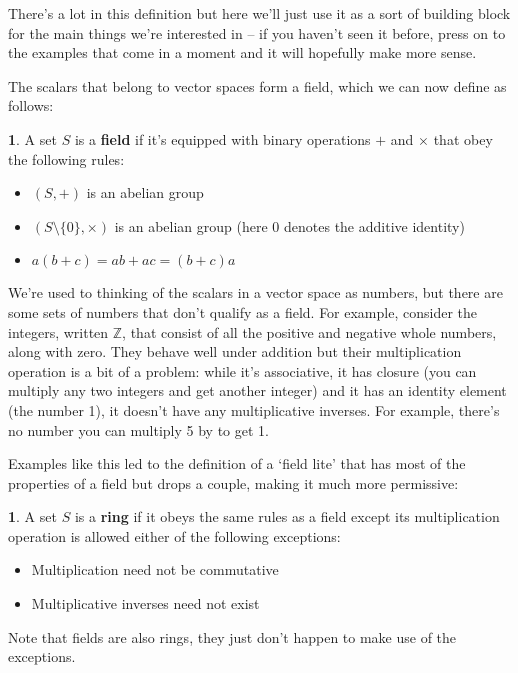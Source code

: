 \documentclass[oneside,english]{amsbook}
\numberwithin{section}{chapter}
\theoremstyle{plain}
\theoremstyle{definition}
\newtheorem{defn}[thm]{\protect\definitionname}
\providecommand{\definitionname}{Definition}
\begin{document}
			There's a lot in this definition but here we'll just use it as a sort of building block for the main things we're interested in -- if you haven't seen it before, press on to the examples that come in a moment and it will hopefully make more sense.
			
			The scalars that belong to vector spaces form a field, which we can now define as follows:
			
			\begin{defn}
				A set $S$ is a \textbf{field} if it's equipped with binary operations $+$ and $\times$ that obey the following rules:
				\begin{itemize}
					\item $(S, +)$ is an abelian group
					\item $(S\setminus\{0\}, \times)$ is an abelian group (here $0$ denotes the additive identity)
					\item $a(b + c) = ab + ac = (b + c)a$
				\end{itemize}
			\end{defn}
			
			We're used to thinking of the scalars in a vector space as numbers, but there are some sets of numbers that don't qualify as a field. For example, consider the integers, written $\mathbb{Z}$, that consist of all the positive and negative whole numbers, along with zero. They behave well under addition but their multiplication operation is a bit of a problem: while it's associative, it has closure (you can multiply any two integers and get another integer) and it has an identity element (the number 1), it doesn't have any multiplicative inverses. For example, there's no number you can multiply 5 by to get 1.
			
			Examples like this led to the definition of a `field lite' that has most of the properties of a field but drops a couple, making it much more permissive:
		
			\begin{defn}
				A set $S$ is a \textbf{ring} if it obeys the same rules as a field except its multiplication operation is allowed either of the following exceptions:
				\begin{itemize}
					\item Multiplication need not be commutative
					\item Multiplicative inverses need not exist
					\end{itemize}
			\end{defn}
			
			Note that fields are also rings, they just don't happen to make use of the exceptions. 
		
\end{document}
